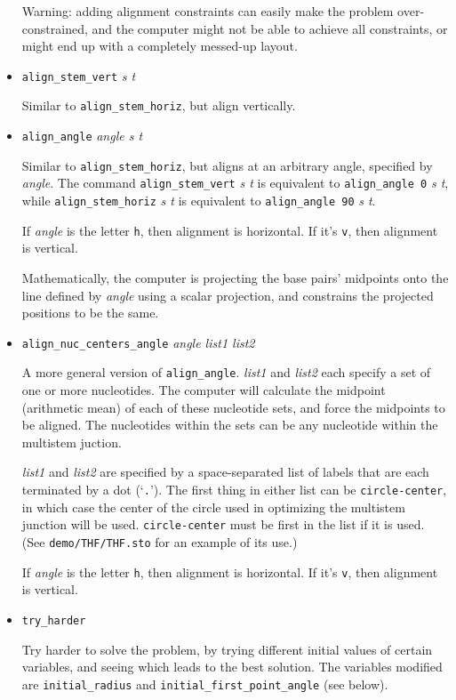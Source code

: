 \documentclass[letterpaper,12pt]{report}
\begin{document}
\begin{itemize}
Warning: adding alignment constraints can easily make the problem over-constrained,
and the computer might not be able to achieve all constraints, or might end up with
a completely messed-up layout.
\item
{\tt align\_stem\_vert} \textit{ s t}

Similar to {\tt align\_stem\_horiz}, but align vertically.
\item
{\tt align\_angle} \textit{angle s t}

Similar to {\tt align\_stem\_horiz}, but aligns at an arbitrary angle, specified by
{\it angle}.
The command {\tt align\_stem\_vert} \textit{ s t} is equivalent to
{\tt align\_angle 0} \textit{s t}, while 
{\tt align\_stem\_horiz} \textit{ s t} is equivalent to
{\tt align\_angle 90} \textit{s t}.

If {\it angle} is the letter {\tt h}, then alignment is horizontal.  If it's
{\tt v}, then alignment is vertical.

Mathematically, the computer is projecting the base pairs' midpoints onto the line
defined by {\it angle} using a scalar projection, and constrains the projected
positions to be the same.
\item
{\tt align\_nuc\_centers\_angle} {\it angle list1 list2}

A more general version of {\tt align\_angle}.
{\it list1} and {\it list2} each specify a set of one or more nucleotides.
The computer will calculate the midpoint (arithmetic mean) of each
of these nucleotide sets, and force the midpoints to be aligned.
The nucleotides within the sets can be any nucleotide within the multistem juction.

{\it list1} and {\it list2} are specified by a space-separated list of labels that are each terminated
by a dot (`{\tt .}').
The first thing in either list can be {\tt circle-center}, in which case the center of
the circle used in optimizing the multistem junction will be used.  {\tt circle-center}
must be first in the list if it is used.
(See {\tt demo/THF/THF.sto} for an example of its use.)

If {\it angle} is the letter {\tt h}, then alignment is horizontal.  If it's
{\tt v}, then alignment is vertical.
\item
{\tt try\_harder}

Try harder to solve the problem, by trying different initial values of certain
variables, and seeing which leads to the best solution.
The variables modified are {\tt initial\_radius} and {\tt initial\_first\_point\_angle} (see below).


\end{itemize}
\end{document}
